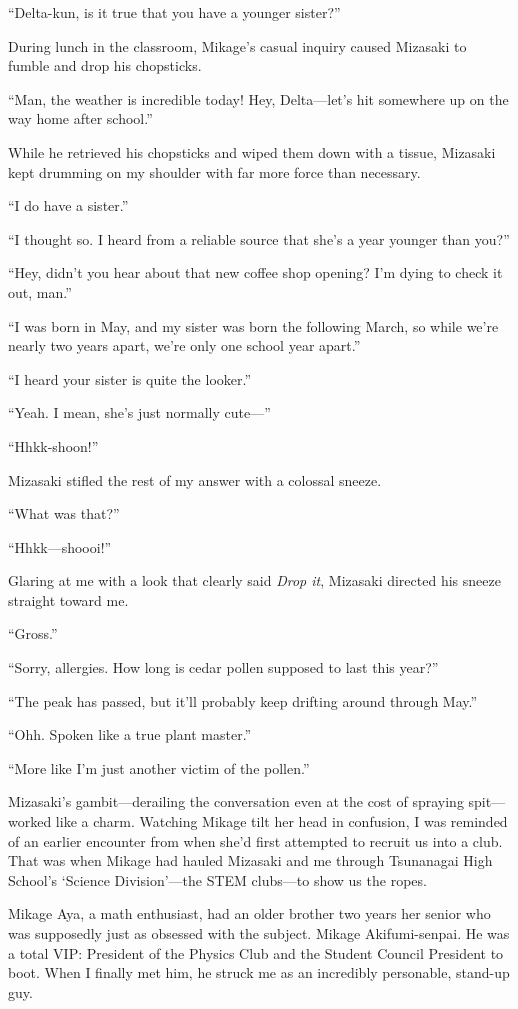 \documentclass[
    a4paper,
    12pt,
    twoside,
    openany,
    UTF8,
    fontset=windows
]{ctexbook}
\begin{document}
``Delta-kun, is it true that you have a younger sister?''

During lunch in the classroom, Mikage's casual inquiry caused Mizasaki to fumble and drop his chopsticks.

``Man, the weather is incredible today! Hey, Delta---let's hit somewhere up on the way home after school.''

While he retrieved his chopsticks and wiped them down with a tissue, Mizasaki kept drumming on my shoulder with far more force than necessary.

``I do have a sister.''

``I thought so. I heard from a reliable source that she's a year younger than you?''

``Hey, didn't you hear about that new coffee shop opening? I'm dying to check it out, man.''

``I was born in May, and my sister was born the following March, so while we're nearly two years apart, we're only one school year apart.''

``I heard your sister is quite the looker.''

``Yeah. I mean, she's just normally cute---''

``Hhkk-shoon!''

Mizasaki stifled the rest of my answer with a colossal sneeze.

``What was that?''

``Hhkk---shoooi!''

Glaring at me with a look that clearly said \textit{Drop it}, Mizasaki directed his sneeze straight toward me.

``Gross.''

``Sorry, allergies. How long is cedar pollen supposed to last this year?''

``The peak has passed, but it'll probably keep drifting around through May.''

``Ohh. Spoken like a true plant master.''

``More like I'm just another victim of the pollen.''

Mizasaki's gambit---derailing the conversation even at the cost of spraying spit---worked like a charm. Watching Mikage tilt her head in confusion, I was reminded of an earlier encounter from when she'd first attempted to recruit us into a club. That was when Mikage had hauled Mizasaki and me through Tsunanagai High School's `Science Division'---the STEM clubs---to show us the ropes.

Mikage Aya, a math enthusiast, had an older brother two years her senior who was supposedly just as obsessed with the subject. Mikage Akifumi-senpai. He was a total VIP: President of the Physics Club and the Student Council President to boot. When I finally met him, he struck me as an incredibly personable, stand-up guy.
\end{document}

